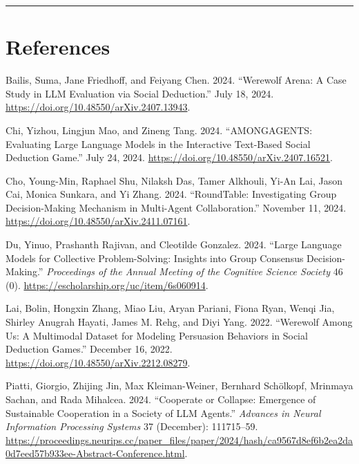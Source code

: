 \documentclass[
  letterpaper,
  DIV=11,
  numbers=noendperiod]{scrreprt}
\newlength{\cslhangindent}
\newenvironment{CSLReferences}[2] %
 {\begin{list}{}{%
  \setlength{\itemindent}{0pt}
  \setlength{\leftmargin}{0pt}
  \setlength{\parsep}{0pt}
  \ifodd #1
   \setlength{\leftmargin}{\cslhangindent}
   \setlength{\itemindent}{-1\cslhangindent}
  \fi
  \setlength{\itemsep}{#2\baselineskip}}}
 {\end{list}}
\begin{document}
\begin{center}\rule{0.5\linewidth}{0.5pt}\end{center}

\chapter{References}\label{references}

\label{refs}
\begin{CSLReferences}{1}{0}
Bailis, Suma, Jane Friedhoff, and Feiyang Chen. 2024. {``Werewolf
{Arena}: {A Case Study} in {LLM Evaluation} via {Social Deduction}.''}
July 18, 2024. \url{https://doi.org/10.48550/arXiv.2407.13943}.

Chi, Yizhou, Lingjun Mao, and Zineng Tang. 2024. {``{AMONGAGENTS}:
{Evaluating Large Language Models} in the {Interactive Text-Based Social
Deduction Game}.''} July 24, 2024.
\url{https://doi.org/10.48550/arXiv.2407.16521}.

Cho, Young-Min, Raphael Shu, Nilaksh Das, Tamer Alkhouli, Yi-An Lai,
Jason Cai, Monica Sunkara, and Yi Zhang. 2024. {``{RoundTable}:
{Investigating Group Decision-Making Mechanism} in {Multi-Agent
Collaboration}.''} November 11, 2024.
\url{https://doi.org/10.48550/arXiv.2411.07161}.

Du, Yinuo, Prashanth Rajivan, and Cleotilde Gonzalez. 2024. {``Large
{Language Models} for {Collective Problem-Solving}: {Insights} into
{Group Consensus Decision-Making}.''} \emph{Proceedings of the Annual
Meeting of the Cognitive Science Society} 46 (0).
\url{https://escholarship.org/uc/item/6s060914}.

Lai, Bolin, Hongxin Zhang, Miao Liu, Aryan Pariani, Fiona Ryan, Wenqi
Jia, Shirley Anugrah Hayati, James M. Rehg, and Diyi Yang. 2022.
{``Werewolf {Among Us}: {A Multimodal Dataset} for {Modeling Persuasion
Behaviors} in {Social Deduction Games}.''} December 16, 2022.
\url{https://doi.org/10.48550/arXiv.2212.08279}.

Piatti, Giorgio, Zhijing Jin, Max Kleiman-Weiner, Bernhard Schölkopf,
Mrinmaya Sachan, and Rada Mihalcea. 2024. {``Cooperate or {Collapse}:
{Emergence} of {Sustainable Cooperation} in a {Society} of {LLM
Agents}.''} \emph{Advances in Neural Information Processing Systems} 37
(December): 111715--59.
\url{https://proceedings.neurips.cc/paper_files/paper/2024/hash/ca9567d8ef6b2ea2da0d7eed57b933ee-Abstract-Conference.html}.


\end{CSLReferences}
\end{document}
